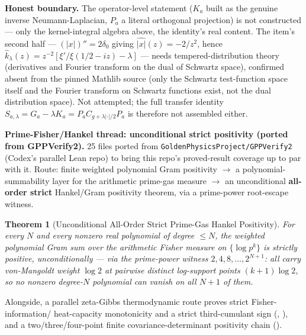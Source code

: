\documentclass{report}
\newtheorem{theorem}{Theorem}[chapter]
\theoremstyle{definition}
\begin{document}
\textbf{Honest boundary.} The operator-level statement ($K_a$ built as the genuine inverse
Neumann-Laplacian, $P_a$ a literal orthogonal projection) is not constructed --- only the
kernel-integral algebra above, the identity's real content. The item's second half ---
$(|x|)''=2\delta_0$ giving $\widehat{|x|}(z)=-2/z^2$, hence
$\hat{k}_\lambda(z)=z^{-2}[\xi'/\xi(1/2-iz)-\lambda]$ --- needs tempered-distribution
theory (derivatives and Fourier transform on the dual of Schwartz space), confirmed absent
from the pinned Mathlib source (only the Schwartz test-function space itself and the
Fourier transform on Schwartz functions exist, not the dual distribution space). Not
attempted; the full transfer identity $S_{a,\lambda}=G_a-\lambda K_a=P_aC_{g+\lambda|\cdot|/2}P_a$
is therefore not assembled either.

\textbf{Prime-Fisher/Hankel thread: unconditional strict positivity (ported from GPPVerify2).}
25 files ported from \texttt{GoldenPhysicsProject/GPPVerify2} (Codex's parallel Lean repo)
to bring this repo's proved-result coverage up to par with it. Route: finite weighted
polynomial Gram positivity $\to$ a polynomial-summability layer for the arithmetic
prime-gas measure $\to$ an unconditional \textbf{all-order strict} Hankel/Gram positivity
theorem, via a prime-power root-escape witness.

\begin{theorem}[Unconditional All-Order Strict Prime-Gas Hankel Positivity]
  \label{thm:prime-hankel-all-order-strict}
  \leanok
  For every $N$ and every nonzero real polynomial of degree $\le N$, the weighted
  polynomial Gram sum over the arithmetic Fisher measure on $\{\log p^k\}$ is strictly
  positive, unconditionally --- via the prime-power witness $2,4,8,\dots,2^{N+1}$: all
  carry von-Mangoldt weight $\log 2$ at pairwise distinct log-support points
  $(k{+}1)\log 2$, so no nonzero degree-$N$ polynomial can vanish on all $N{+}1$ of them.
\end{theorem}

Alongside, a parallel zeta-Gibbs thermodynamic route proves strict Fisher-information/
heat-capacity monotonicity and a strict third-cumulant sign
(,
), and a two/three/four-point
finite covariance-determinant positivity chain
().
\end{document}
